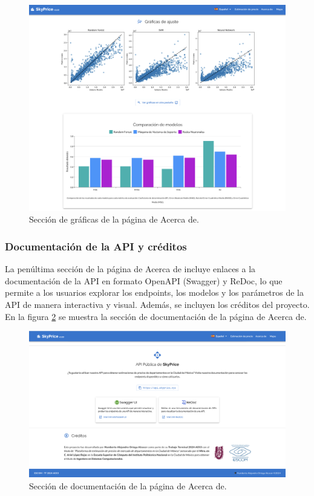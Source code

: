 \begin{figure}[H]
    \centering
    \includegraphics[width=1.0\textwidth]{imagenes/05-implementacion/interfaz-grafica/acerca-de-modelos-graficas.png}
    \caption{Sección de gráficas de la página de Acerca de.}
    \label{fig:acerca-de-graficas}
\end{figure}

\subsubsection{Documentación de la API y créditos}
La penúltima sección de la página de Acerca de incluye enlaces a la documentación
de la API en formato OpenAPI (Swagger) y ReDoc, lo que permite a los usuarios explorar
los endpoints, los modelos y los parámetros de la API de manera interactiva y visual.
Además, se incluyen los créditos del proyecto.
En la figura \ref{fig:acerca-de-documentacion} se muestra la sección de documentación
de la página de Acerca de.

\begin{figure}[H]
    \centering
    \includegraphics[width=1.0\textwidth]{imagenes/05-implementacion/interfaz-grafica/acerca-de-documentacion.png}
    \caption{Sección de documentación de la página de Acerca de.}
    \label{fig:acerca-de-documentacion}
\end{figure}

